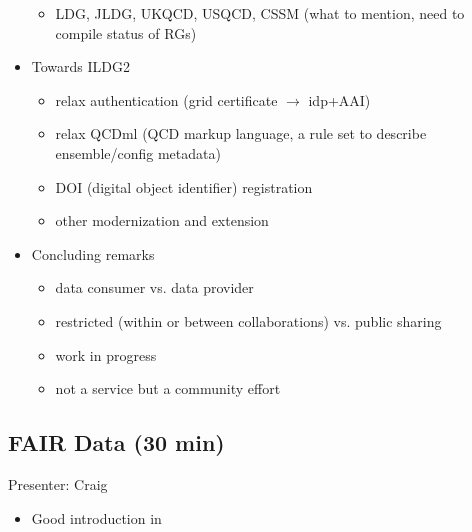 \documentclass{article}
\begin{document}
\begin{itemize}
        \begin{itemize}
            \item LDG, JLDG, UKQCD, USQCD, CSSM (what to mention, need to compile status of RGs)
        \end{itemize}
    \item Towards ILDG2
    \begin{itemize}
        \item relax authentication (grid certificate $\to$ idp+AAI)
        \item relax QCDml (QCD markup language, a rule set to describe ensemble/config metadata)
        \item DOI (digital object identifier) registration
        \item other modernization and extension 
        \end{itemize}
    \item Concluding remarks
    \begin{itemize}
        \item data consumer vs. data provider
        \item restricted (within or between collaborations) vs. public sharing
        \item work in progress
        \item not a service but a community effort
    \end{itemize}
\end{itemize}

\subsection{FAIR Data (30 min)}
Presenter: Craig
\begin{itemize}
    \item Good introduction in \cite{Karsch:2022tqw}
\end{itemize}
\end{document}
